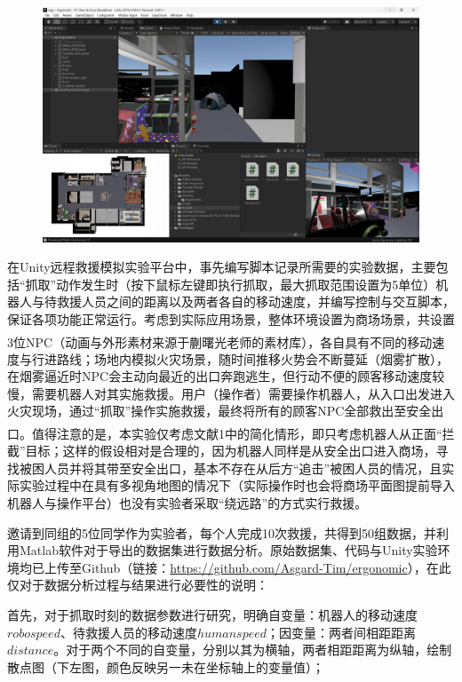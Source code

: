 \documentclass[12pt]{article}  %
\newcommand{\upcite}[1]{\textsuperscript{\textsuperscript{\cite{#1}}}}
\begin{document}
	\begin{figure}[H]
		\centering
		\includegraphics[width=1\textwidth]{2.png}
	\end{figure}
	
	在Unity远程救援模拟实验平台中，事先编写脚本记录所需要的实验数据，主要包括“抓取”动作发生时（按下鼠标左键即执行抓取，最大抓取范围设置为5单位）机器人与待救援人员之间的距离以及两者各自的移动速度，并编写控制与交互脚本，保证各项功能正常运行。考虑到实际应用场景，整体环境设置为商场场景，共设置3位NPC（动画与外形素材来源于蒯曙光老师的素材库\upcite{11}），各自具有不同的移动速度与行进路线；场地内模拟火灾场景，随时间推移火势会不断蔓延（烟雾扩散），在烟雾逼近时NPC会主动向最近的出口奔跑逃生，但行动不便的顾客移动速度较慢，需要机器人对其实施救援。用户（操作者）需要操作机器人，从入口出发进入火灾现场，通过“抓取”操作实施救援，最终将所有的顾客NPC全部救出至安全出口。值得注意的是，本实验仅考虑文献1\upcite{1}中的简化情形，即只考虑机器人从正面“拦截”目标；这样的假设相对是合理的，因为机器人同样是从安全出口进入商场，寻找被困人员并将其带至安全出口，基本不存在从后方“追击”被困人员的情况，且实际实验过程中在具有多视角地图的情况下（实际操作时也会将商场平面图提前导入机器人与操作平台）也没有实验者采取“绕远路”的方式实行救援。
	
	邀请到同组的5位同学作为实验者，每个人完成10次救援，共得到50组数据，并利用Matlab软件对于导出的数据集进行数据分析。原始数据集、代码与Unity实验环境均已上传至Github（链接：\href{https://github.com/Asgard-Tim/ergonomic}{https://github.com/Asgard-Tim/ergonomic}），在此仅对于数据分析过程与结果进行必要性的说明：
	
	首先，对于抓取时刻的数据参数进行研究，明确自变量：机器人的移动速度$robospeed$、待救援人员的移动速度$humanspeed$；因变量：两者间相距距离$distance$。对于两个不同的自变量，分别以其为横轴，两者相距距离为纵轴，绘制散点图（下左图，颜色反映另一未在坐标轴上的变量值）；
	
\end{document}
